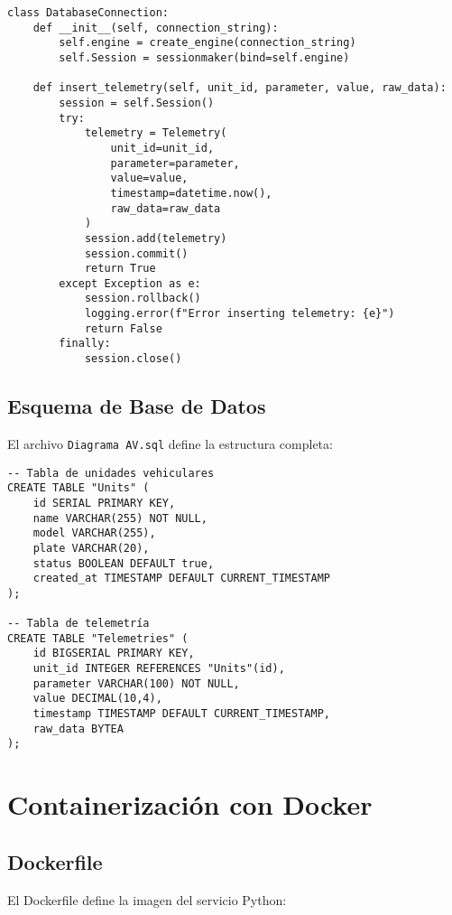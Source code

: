 \begin{verbatim}
class DatabaseConnection:
    def __init__(self, connection_string):
        self.engine = create_engine(connection_string)
        self.Session = sessionmaker(bind=self.engine)
    
    def insert_telemetry(self, unit_id, parameter, value, raw_data):
        session = self.Session()
        try:
            telemetry = Telemetry(
                unit_id=unit_id,
                parameter=parameter,
                value=value,
                timestamp=datetime.now(),
                raw_data=raw_data
            )
            session.add(telemetry)
            session.commit()
            return True
        except Exception as e:
            session.rollback()
            logging.error(f"Error inserting telemetry: {e}")
            return False
        finally:
            session.close()
\end{verbatim}

\subsection{Esquema de Base de Datos}

El archivo \texttt{Diagrama AV.sql} define la estructura completa:

\begin{verbatim}
-- Tabla de unidades vehiculares
CREATE TABLE "Units" (
    id SERIAL PRIMARY KEY,
    name VARCHAR(255) NOT NULL,
    model VARCHAR(255),
    plate VARCHAR(20),
    status BOOLEAN DEFAULT true,
    created_at TIMESTAMP DEFAULT CURRENT_TIMESTAMP
);

-- Tabla de telemetría
CREATE TABLE "Telemetries" (
    id BIGSERIAL PRIMARY KEY,
    unit_id INTEGER REFERENCES "Units"(id),
    parameter VARCHAR(100) NOT NULL,
    value DECIMAL(10,4),
    timestamp TIMESTAMP DEFAULT CURRENT_TIMESTAMP,
    raw_data BYTEA
);
\end{verbatim}

\section{Containerización con Docker}

\subsection{Dockerfile}

El Dockerfile define la imagen del servicio Python:

